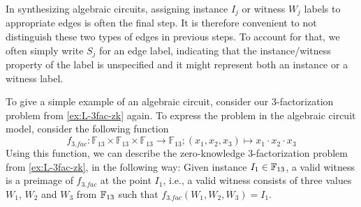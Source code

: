\begin{notation}
In synthesizing algebraic circuits, assigning instance $I_j$ or witness $W_j$ labels to appropriate edges is often the final step. It is therefore convenient to not distinguish these two types of edges in previous steps. To account for that, we often simply write $S_j$ for an edge label, indicating that the instance/witness property of the label is unspecified and it might represent both an instance or a witness label. 
\end{notation}
\begin{example}
\label{ex:3-fac-zk-circuit} To give a simple example of an algebraic circuit, consider our $3$-factorization problem from \examplename{} \ref{ex:L-3fac-zk} again.  To express the problem in the algebraic circuit model, consider the following function 
\[
f_{3.fac}:\mathbb{F}_{13}\times\mathbb{F}_{13}\times\mathbb{F}_{13}\to\mathbb{F}_{13};(x_{1},x_{2},x_{3})\mapsto x_{1}\cdot x_{2}\cdot x_{3}
\]
Using this function, we can describe the zero-knowledge $3$-factorization problem from \ref{ex:L-3fac-zk}, in the following way: Given instance $I_1\in \mathbb{F}_{13}$, a valid witness is a preimage of $f_{3.fac}$ at the point $I_1$, i.e., a valid witness consists of three values $W_1$, $W_2$ and $W_3$ from $\mathbb{F}_{13}$ such that $f_{3.fac}(W_1,W_2,W_3)=I_1$. 


\end{example}

